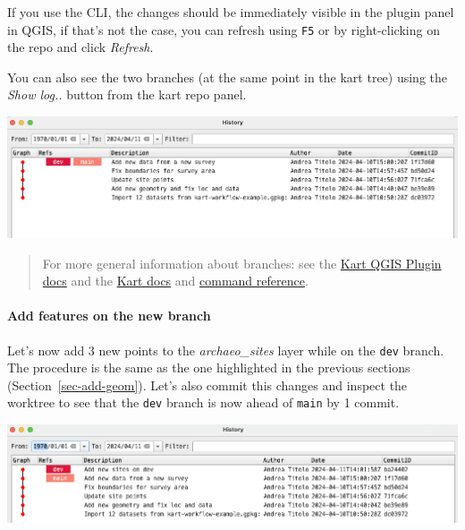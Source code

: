 \documentclass[
  letterpaper,
  DIV=11,
  numbers=noendperiod]{scrartcl}
\let\oldparagraph\paragraph
\renewcommand{\paragraph}[1]{\oldparagraph{#1}\mbox{}}
\begin{document}
If you use the CLI, the changes should be immediately visible in the
plugin panel in QGIS, if that's not the case, you can refresh using
\texttt{F5} or by right-clicking on the repo and click \emph{Refresh}.

You can also see the two branches (at the same point in the kart tree)
using the \emph{Show log..} button from the kart repo panel.

\begin{center}
\includegraphics{img/kart-panel-branches-log.png}
\end{center}

\begin{quote}
For more general information about branches: see the
\href{https://github.com/koordinates/kart-qgis-plugin/blob/main/docs/index.md\#working-with-branches}{Kart
QGIS Plugin docs} and the
\href{https://docs.kartproject.org/en/latest/pages/quick_guide.html\#branching}{Kart
docs} and
\href{https://docs.kartproject.org/en/latest/pages/command_reference.html\#branching-and-merging}{command
reference}.
\end{quote}

\paragraph{Add features on the new
branch}\label{add-features-on-the-new-branch}

Let's now add 3 new points to the \emph{archaeo\_sites} layer while on
the \texttt{dev} branch. The procedure is the same as the one
highlighted in the previous sections (Section~\ref{sec-add-geom}). Let's
also commit this changes and inspect the worktree to see that the
\texttt{dev} branch is now ahead of \texttt{main} by 1 commit.

\begin{center}
\includegraphics{img/kart-panel-dev-branch-ahead.png}
\end{center}
\end{document}
